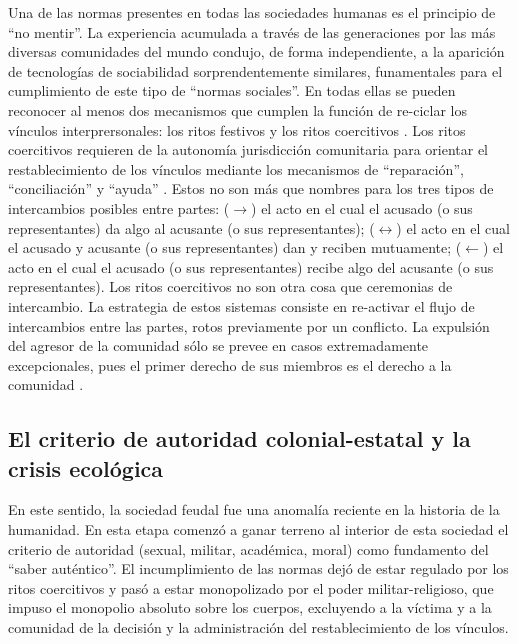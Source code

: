 \documentclass[a4paper,10pt]{book}
\begin{document}
Una de las normas presentes en todas las sociedades humanas es el principio de ``no mentir''.
%
La experiencia acumulada a través de las generaciones por las más diversas comunidades del mundo condujo, de forma independiente, a la aparición de tecnologías de sociabilidad sorprendentemente similares, funamentales para el cumplimiento de este tipo de ``normas sociales''.
%
En todas ellas se pueden reconocer al menos dos mecanismos que cumplen la función de re-ciclar los v\'inculos interprersonales: los ritos festivos y los ritos coercitivos \cite{segato}.
%
Los ritos coercitivos requieren de la autonomía jurisdicción comunitaria para orientar el restablecimiento de los vínculos mediante los mecanismos de ``reparación'', ``conciliación'' y ``ayuda'' \cite{zaffaroni2013}.
%
Estos no son más que nombres para los tres tipos de intercambios posibles entre partes: ($\rightarrow$) el acto en el cual el acusado (o sus representantes) da algo al acusante (o sus representantes); ($\leftrightarrow$) el acto en el cual el acusado y acusante (o sus representantes) dan y reciben mutuamente; ($\leftarrow$) el acto en el cual el acusado (o sus representantes) recibe algo del acusante (o sus representantes).
%
Los ritos coercitivos no son otra cosa que ceremonias de intercambio.
%
La estrategia de estos sistemas consiste en re-activar el flujo de intercambios entre las partes, rotos previamente por un conflicto.
%
La expulsión del agresor de la comunidad sólo se prevee en casos extremadamente excepcionales, pues el primer derecho de sus miembros es el derecho a la comunidad \cite{segato}.

%

\subsection{El criterio de autoridad colonial-estatal y la crisis ecológica}

En este sentido, la sociedad feudal fue una anomalía reciente en la historia de la humanidad.
%
En esta etapa comenzó a ganar terreno al interior de esta sociedad el criterio de autoridad (sexual, militar, académica, moral) como fundamento del ``saber auténtico''.
%
El incumplimiento de las normas dejó de estar regulado por los ritos coercitivos y pasó a estar monopolizado por el poder militar-religioso, que impuso el monopolio absoluto sobre los cuerpos, excluyendo a la víctima y a la comunidad de la decisión y la administración del restablecimiento de los vínculos.

%
\end{document}
